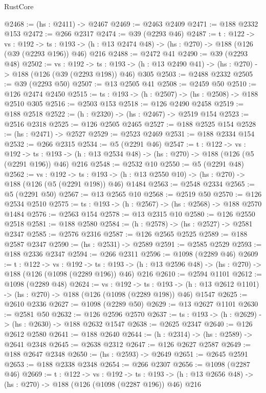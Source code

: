 \begin{lexlean}{RustCore}
\begin{coremodule}
@2468 := (hs : @2411) -> @2467
@2469 := @2463 @2409
@2471 := @188 @2332 @153
@2472 := @266 @2317
@2474 := @39 (@2293 @46)
@2487 := {t : @122} ->
  {vs : @192} ->
  {ts : @193} -> (h : @13 @2474 @48) -> (hs : @270) -> @188 (@126 (@39 (@2293 @196)) @46) @216
@2488 := @2472 @41
@2490 := @39 (@2293 @48)
@2502 := {vs : @192} ->
  {ts : @193} -> (h : @13 @2490 @41) -> (hs : @270) -> @188 (@126 (@39 (@2293 @198)) @46) @305
@2503 := @2488 @2332
@2505 := @39 (@2293 @50)
@2507 := @13 @2505 @41
@2508 := @2459 @50
@2510 := @126 @2474 @2450
@2515 := {ts : @193} -> (h : @2507) -> (hs : @2508) -> @188 @2510 @305
@2516 := @2503 @153
@2518 := @126 @2490 @2458
@2519 := @188 @2518
@2522 := (h : @2320) -> (hs : @2467) -> @2519 @154
@2523 := @2516 @2318
@2525 := @126 @2505 @2465
@2527 := @188 @2525 @154
@2528 := (hs : @2471) -> @2527
@2529 := @2523 @2469
@2531 := @188 @2334 @154
@2532 := @266 @2315
@2534 := @5 (@2291 @46)
@2547 := {t : @122} ->
  {vs : @192} ->
  {ts : @193} -> (h : @13 @2534 @48) -> (hs : @270) -> @188 (@126 (@5 (@2291 @196)) @46) @216
@2548 := @2532 @10
@2550 := @5 (@2291 @48)
@2562 := {vs : @192} ->
  {ts : @193} -> (h : @13 @2550 @10) -> (hs : @270) -> @188 (@126 (@5 (@2291 @198)) @46) @1484
@2563 := @2548 @2334
@2565 := @5 (@2291 @50)
@2567 := @13 @2565 @10
@2568 := @2519 @50
@2570 := @126 @2534 @2510
@2575 := {ts : @193} -> (h : @2567) -> (hs : @2568) -> @188 @2570 @1484
@2576 := @2563 @154
@2578 := @13 @2315 @10
@2580 := @126 @2550 @2518
@2581 := @188 @2580
@2584 := (h : @2578) -> (hs : @2527) -> @2581 @2347
@2585 := @2576 @2316
@2587 := @126 @2565 @2525
@2589 := @188 @2587 @2347
@2590 := (hs : @2531) -> @2589
@2591 := @2585 @2529
@2593 := @188 @2336 @2347
@2594 := @266 @2311
@2596 := @1098 (@2289 @46)
@2609 := {t : @122} ->
  {vs : @192} ->
  {ts : @193} -> (h : @13 @2596 @48) -> (hs : @270) -> @188 (@126 (@1098 (@2289 @196)) @46) @216
@2610 := @2594 @1101
@2612 := @1098 (@2289 @48)
@2624 := {vs : @192} ->
  {ts : @193} -> (h : @13 @2612 @1101) -> (hs : @270) -> @188 (@126 (@1098 (@2289 @198)) @46) @1547
@2625 := @2610 @2336
@2627 := @1098 (@2289 @50)
@2629 := @13 @2627 @1101
@2630 := @2581 @50
@2632 := @126 @2596 @2570
@2637 := {ts : @193} -> (h : @2629) -> (hs : @2630) -> @188 @2632 @1547
@2638 := @2625 @2347
@2640 := @126 @2612 @2580
@2641 := @188 @2640
@2644 := (h : @2314) -> (hs : @2589) -> @2641 @2348
@2645 := @2638 @2312
@2647 := @126 @2627 @2587
@2649 := @188 @2647 @2348
@2650 := (hs : @2593) -> @2649
@2651 := @2645 @2591
@2653 := @188 @2338 @2348
@2654 := @266 @2307
@2656 := @1098 (@2287 @46)
@2669 := {t : @122} ->
  {vs : @192} ->
  {ts : @193} -> (h : @13 @2656 @48) -> (hs : @270) -> @188 (@126 (@1098 (@2287 @196)) @46) @216

\end{coremodule}
\end{lexlean}
